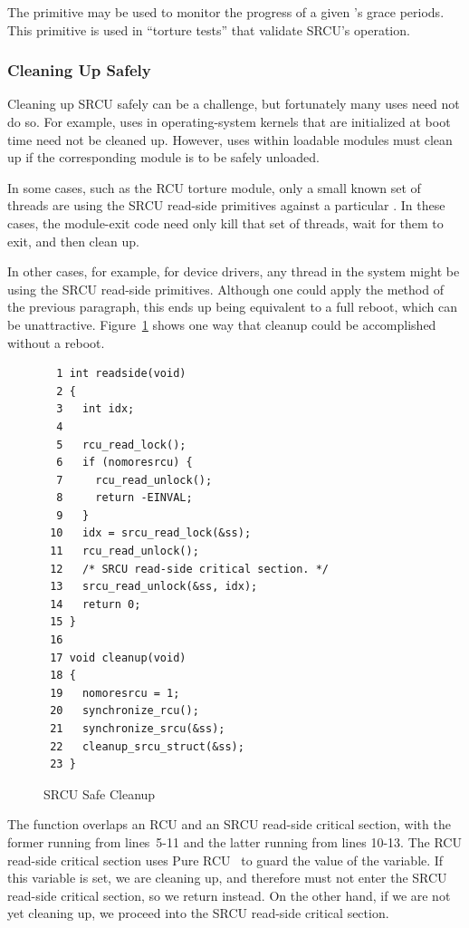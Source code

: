 The  primitive may be used to
monitor the progress of a given  's
grace periods.
This primitive is used in ``torture tests'' that validate SRCU's operation.

\subsubsection{Cleaning Up Safely}
\label{sec:app:rcuimpl:Cleaning Up Safely}

Cleaning up SRCU safely can be a challenge, but fortunately many
uses need not do so.
For example, uses in operating-system kernels that are initialized at
boot time need not be cleaned up.
However, uses within loadable modules must clean up if the corresponding
module is to be safely unloaded.

In some cases, such as the RCU torture module,
only a small known set of threads are using the
SRCU read-side primitives against a particular  .
In these cases, the module-exit code need only kill that set of threads,
wait for them to exit, and then clean up.

In other cases, for example, for device drivers, any thread in the
system might be using the SRCU read-side primitives.
Although one could apply the method of the previous paragraph, this
ends up being equivalent to a full reboot, which can be unattractive.
Figure~\ref{fig:app:rcuimpl:SRCU Safe Cleanup} shows one way that cleanup
could be accomplished without a reboot.

\begin{figure}[htbp]
{ \scriptsize
\begin{verbatim}
  1 int readside(void)
  2 {
  3   int idx;
  4
  5   rcu_read_lock();
  6   if (nomoresrcu) {
  7     rcu_read_unlock();
  8     return -EINVAL;
  9   }
 10   idx = srcu_read_lock(&ss);
 11   rcu_read_unlock();
 12   /* SRCU read-side critical section. */
 13   srcu_read_unlock(&ss, idx);
 14   return 0;
 15 }
 16
 17 void cleanup(void)
 18 {
 19   nomoresrcu = 1;
 20   synchronize_rcu();
 21   synchronize_srcu(&ss);
 22   cleanup_srcu_struct(&ss);
 23 }
\end{verbatim}
}
\caption{SRCU Safe Cleanup}
\label{fig:app:rcuimpl:SRCU Safe Cleanup}
\end{figure}

The  function overlaps an RCU and an SRCU read-side
critical section, with the former running from lines~5-11 and the
latter running from lines 10-13.
The RCU read-side critical section uses Pure
%
%
RCU~\cite{PaulEdwardMcKenneyPhD}
%
to guard the
value of the  variable.
If this variable is set, we are cleaning up, and therefore must not enter
the SRCU read-side critical section, so we return  instead.
On the other hand, if we are not yet cleaning up, we proceed into the
SRCU read-side critical section.

